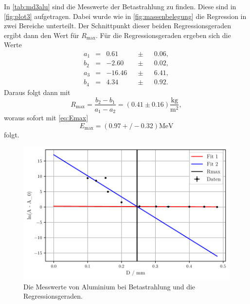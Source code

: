 In \autoref{tab:md3alu} sind die Messwerte der Betastrahlung zu finden.
Diese sind in \autoref{fig:plot3} aufgetragen.
Dabei wurde wie in \autoref{fig:massenbelegung} die Regression in zwei Bereiche unterteilt.
Der Schnittpunkt dieser beiden Regressionsgeraden ergibt dann den Wert für $R_\text{max}$.
Für die Regressionsgeraden ergeben sich die Werte 
\begin{align*}
    a_1&=& 0.61 &&\pm&& 0.06,\\
    b_2&=& -2.60 &&\pm&& 0.02,\\
    a_3&=& -16.46 &&\pm&& 6.41,\\
    b_4&=& 4.34 &&\pm&& 0.92.
\end{align*}
Daraus folgt dann mit
\begin{equation*}
    R_\text{max} = \frac{b_2 - b_1}{a_1 - a_2} = (0.41 \pm 0.16) \frac{\unit{\kilo\gram}}{\unit{\meter^2}} ,
\end{equation*}
woraus sofort mit \autoref{eq:Emax} 
\begin{equation*}
    E_\text{max} = (0.97+/-0.32) \unit{\mega\eV}
\end{equation*}
folgt.
\begin{figure}
    \centering
    \includegraphics[width=0.7 \linewidth]{build/plot3.pdf}
    \caption{Die Messwerte von Aluminium bei Betastrahlung und die Regressionsgeraden.}
    \label{fig:plot3}
\end{figure}


